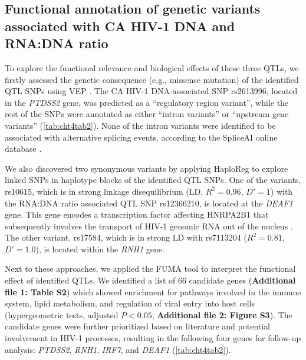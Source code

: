\documentclass{book}
\begin{document}
\begin{refsection}
\subsection*{Functional annotation of genetic variants associated with CA HIV-1 DNA and RNA:DNA ratio}
To explore the functional relevance and biological effects of these three QTLs, we firstly assessed the genetic consequence (e.g., missense mutation) of the identified QTL SNPs using VEP \cite{McLaren2016The}.
The CA HIV-1 DNA-associated SNP rs2613996, located in the \textit{PTDSS2} gene, was predicted as a \enquote{regulatory region variant}, while the rest of the SNPs were annotated as either ``intron variants'' or ``upstream gene variants'' (\ref{tab:cht4tab2}).
None of the intron variants were identified to be associated with alternative splicing events, according to the SpliceAI online database \cite{Jaganathan2019Predicting}.

We also discovered two synonymous variants by applying HaploReg \cite{Ward2011HaploReg} to explore linked SNPs in haplotype blocks of the identified QTL SNPs.
One of the variants, rs10615, which is in strong linkage disequilibrium (LD, $R^2 = 0.96$, $D' = 1$) with the RNA:DNA ratio associated QTL SNP rs12366210, is located at the \textit{DEAF1} gene.
This gene encodes a transcription factor affecting HNRPA2B1 that subsequently involves the transport of HIV-1 genomic RNA out of the nucleus \cite{Michelson1999Nuclear,Lévesque2006Trafficking,Bériault2004A}.
The other variant, rs17584, which is in strong LD with rs7113204 ($R^2 = 0.81$, $D' = 1.0$), is located within the \textit{RNH1} gene.

Next to these approaches, we applied the FUMA tool \cite{Watanabe2017Functional} to interpret the functional effect of identified QTLs.
We identified a list of 66 candidate genes (\textbf{Additional file 1: Table S2}) which showed enrichment for pathways involved in the immune system, lipid metabolism, and regulation of viral entry into host cells (hypergeometric tests, adjusted $P < 0.05$, \textbf{Additional file 2: Figure S3}).
The candidate genes were further prioritized based on literature and potential involvement in HIV-1 processes, resulting in the following four genes for follow-up analysis: \textit{PTDSS2}, \textit{RNH1}, \textit{IRF7}, and \textit{DEAF1} (\ref{tab:cht4tab2}).


\end{refsection}
\end{document}
